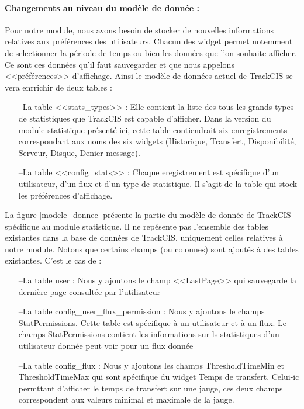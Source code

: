 			\paragraph{Changements au niveau du modèle de donnée :}
			Pour notre module, nous avons besoin de stocker de nouvelles informations
			relatives aux préférences des utilisateurs. Chacun des widget permet
			notemment de selectionner la période de temps ou bien les données que l'on
			souhaite afficher. Ce sont ces données qu'il faut sauvegarder et que nous
			appelons <<préférences>> d'affichage.
			Ainsi le modèle de données actuel de TrackCIS se vera enrrichir de deux tables :
			\begin{itemize}
			  \item[--La table <<stats\_types>> :] Elle contient la liste des tous les
			  grands types de statistiques que TrackCIS est capable d'afficher. Dans la
			  version du module statistique présenté ici, cette table contiendrait
			  six enregistrements correspondant aux noms des six widgets (Historique,
			  Transfert, Disponibilité, Serveur, Disque, Denier message).
			  \item[--La table <<config\_stats>> :] Chaque eregistrement est spécifique
			  d'un utilisateur, d'un flux et d'un type de statistique. Il s'agit de la table
			  qui stock les préférences d'affichage.
			\end{itemize}
			La figure \ref{modele_donnee} présente la partie du modèle de donnée de
			TrackCIS spécifique au module statistique. Il ne repésente pas
			l'ensemble des tables existantes dans la base de données de TrackCIS,
			uniquement celles relatives à notre module. Notons que certains champs (ou
			colonnes) sont ajoutés à des tables existantes. C'est le cas de :
			\begin{itemize}
			  \item[--La table user :] Nous y ajoutons le champ <<LastPage>> qui
			  sauvegarde la dernière page consultée par l'utilisateur
			  \item[--La table config\_user\_flux\_permission :] Nous y ajoutons le
			  champs StatPermissions. Cette table est spécifique à un utilisateur et à un flux.
			  Le champs StatPermissions contient les informations sur ls statistiques
			  d'un utilisateur donnée peut voir pour un flux donnée
			  \item[--La table config\_flux :] Nous y ajoutons les champs
			  ThresholdTimeMin et ThresholdTimeMax qui sont spécifique du widget Temps de transfert.
			  Celui-ic permttant d'afficher le temps de transfert sur une jauge, ces deux
			  champs correspondent aux valeurs minimal et maximale de la jauge.
			\end{itemize}
